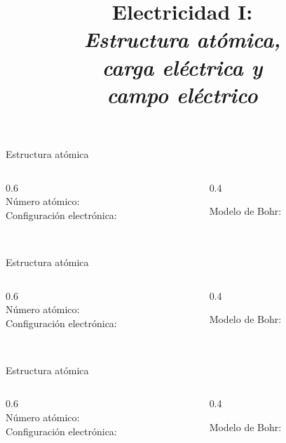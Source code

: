 \documentclass[aspectratio=169]{beamer}
\title{
    Electricidad I:\\
    \alert{\emph{Estructura atómica,}}\\
    \alert{\emph{carga eléctrica y}}\\
    \alert{\emph{campo eléctrico}}
}
\begin{document}


\begin{frame}{Estructura atómica}
    \begin{columns}[onlytextwidth]
    \begin{column}{0.6\textwidth}
        \alert{}\\[8pt]
        Número atómico: \\[8pt]
        Configuración electrónica:\\[8pt] 
        \\[8pt]  
        \end{column}
    \begin{column}{0.4\textwidth}
    \begin{center}
        Modelo de Bohr:\\[8pt]
    \end{center}
\end{column}
\end{columns}
\end{frame}

\begin{frame}{Estructura atómica}
    \begin{columns}[onlytextwidth]
    \begin{column}{0.6\textwidth}
        \alert{}\\[8pt]
        Número atómico: \\[8pt]
        Configuración electrónica:\\[8pt] 
        \\[8pt]  
        \end{column}
    \begin{column}{0.4\textwidth}
    \begin{center}
        Modelo de Bohr:\\[8pt]
    \end{center}
\end{column}
\end{columns}
\end{frame}

\begin{frame}{Estructura atómica}
    \begin{columns}[onlytextwidth]
    \begin{column}{0.6\textwidth}
        \alert{}\\[8pt]
        Número atómico: \\[8pt]
        Configuración electrónica:\\[8pt] 
        \\[8pt]  
        \end{column}
    \begin{column}{0.4\textwidth}
    \begin{center}
        Modelo de Bohr:\\[8pt]
    \end{center}
\end{column}
\end{columns}
\end{frame}
\end{document}
